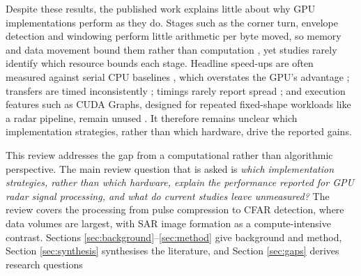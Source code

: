 Despite these results, the published work explains little about why GPU implementations perform as they do.
Stages such as the corner turn, envelope detection and windowing perform little arithmetic per byte moved,
so memory and data movement bound them rather than computation
\cite{williamsRooflineInsightfulVisual2009a, venterSOFTWAREDEFINEDPULSEDOPPLERRADAR, denhamWeatherRadarData2018a},
yet studies rarely identify which resource bounds each stage.
Headline speed-ups are often measured against serial CPU baselines
\cite{zhaoGPUAcceleratedSignalProcessing2023, zhangAcceleratingSpaceborneSAR2016a, denhamWeatherRadarData2018a, perdanaRadarSignalProcessing2019, yangGPUOrientedDesignsConstant2022a},
which overstates the GPU's advantage \cite{leeDebunking100XGPU2010b};
transfers are timed inconsistently \cite{venterSOFTWAREDEFINEDPULSEDOPPLERRADAR, greggWhereDataWhy2011a};
timings rarely report spread \cite{hoeflerScientificBenchmarkingParallel2015a};
and execution features such as CUDA Graphs, designed for repeated fixed-shape workloads like a radar pipeline,
remain unused \cite{ekelundBoostingPerformanceIterative2025a}.
It therefore remains unclear which implementation strategies, rather than which hardware, drive the reported gains.

This review addresses the gap from a computational rather than algorithmic perspective. The main review question that is asked is \emph{which implementation strategies, rather than which hardware, explain the performance reported for GPU radar signal processing, and what do current studies leave unmeasured?} The review covers the processing from pulse compression to CFAR detection, where data volumes are largest, with SAR image formation as a compute-intensive contrast. Sections \ref{sec:background}--\ref{sec:method} give background and method, Section \ref{sec:synthesis} synthesises the literature, and Section \ref{sec:gaps} derives research questions